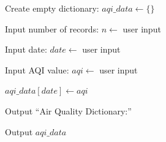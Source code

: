 \begin{algorithm}
\caption{Store Air Quality Index Records}
\begin{algorithmic}[1]

\STATE Create empty dictionary:
\STATE $aqi\_data \gets \{\}$

\STATE Input number of records:
\STATE $n \gets$ user input


    \STATE Input date:
    \STATE $date \gets$ user input

    \STATE Input AQI value:
    \STATE $aqi \gets$ user input

    \STATE $aqi\_data[date] \gets aqi$

\ENDFOR

\STATE Output ``Air Quality Dictionary:''

\STATE Output $aqi\_data$

\end{algorithmic}
\end{algorithm}